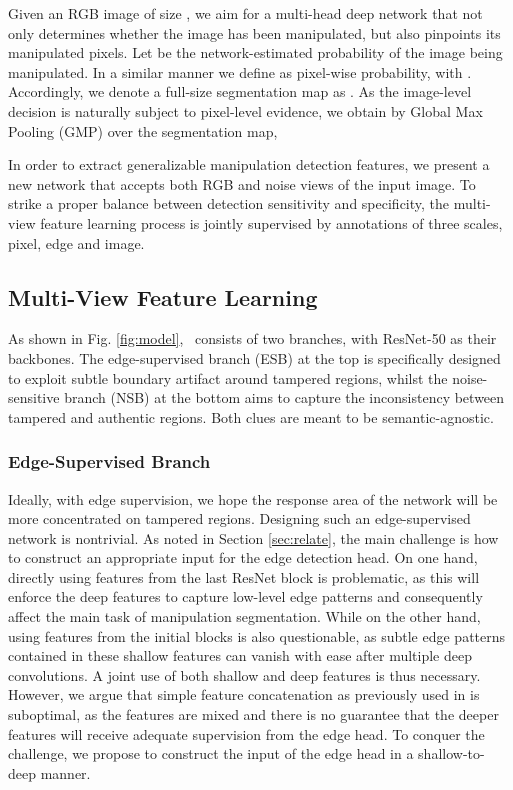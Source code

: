 

Given an RGB image  of size , we aim for a multi-head deep network  that not only determines whether the image has been manipulated, but also pinpoints its manipulated pixels. Let  be the network-estimated probability of the image being manipulated. In a similar manner we define  as pixel-wise probability, with . Accordingly, we denote a full-size segmentation map as . As the image-level decision is naturally subject to pixel-level evidence, we obtain  by Global Max Pooling (GMP) over the segmentation map, \ie 









In order to extract generalizable manipulation detection features, we present a new network that accepts both RGB and noise views of the input image. To strike a proper balance between detection sensitivity and specificity, the multi-view feature learning process is jointly supervised by annotations of three scales, \ie pixel, edge and image. 





\subsection{Multi-View Feature Learning} \label{ssec:mvfl}

As shown in Fig. \ref{fig:model},  \model~consists of two branches, with ResNet-50 as their backbones. The edge-supervised branch (ESB) at the top is specifically designed to exploit subtle boundary artifact around tampered regions, whilst the noise-sensitive branch (NSB) at the bottom aims to capture the inconsistency between tampered and authentic regions. Both clues are meant to be semantic-agnostic. 
\subsubsection{Edge-Supervised Branch }\label{sssec:esb}


Ideally, with edge supervision, we hope the response area of the network will be more concentrated on tampered regions. Designing such an edge-supervised network is nontrivial. As noted in Section \ref{sec:relate}, the main challenge is how to construct an appropriate input for the edge detection head. On one hand, directly using features from the last ResNet block is problematic, as this will enforce the deep features to capture low-level edge patterns and consequently affect the main task of manipulation segmentation. While on the other hand, using features from the initial blocks is also questionable, as subtle edge patterns contained in these shallow features can vanish with ease after multiple deep convolutions. A joint use of both shallow and deep features is thus necessary. However, we argue that simple feature concatenation as previously used in \cite{2020GSR} is suboptimal, as the features are mixed and there is no guarantee that the deeper features will receive adequate supervision from the edge head. To conquer the challenge, we propose to construct the input of the edge head in a shallow-to-deep manner.




